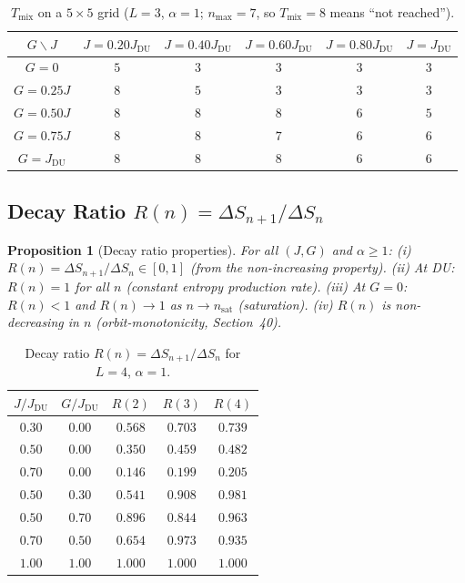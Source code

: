 \documentclass[12pt,a4paper]{article}
\newtheorem{proposition}[theorem]{Proposition}
\begin{document}
\begin{table}[h]
\centering
\caption{$T_\mathrm{mix}$ on a $5\times5$ grid ($L=3$, $\alpha=1$; $n_\mathrm{max}=7$,
so $T_\mathrm{mix}=8$ means ``not reached'').}
\label{tab:tmix}
\begin{tabular}{c|ccccc}
\hline
$G\backslash J$ & $J=0.20J_\mathrm{DU}$ & $J=0.40J_\mathrm{DU}$ & $J=0.60J_\mathrm{DU}$ & $J=0.80J_\mathrm{DU}$ & $J=J_\mathrm{DU}$ \\
\hline
$G=0$            & $5$ & $3$ & $3$ & $3$ & $3$ \\
$G=0.25J$        & $8$ & $5$ & $3$ & $3$ & $3$ \\
$G=0.50J$        & $8$ & $8$ & $8$ & $6$ & $5$ \\
$G=0.75J$        & $8$ & $8$ & $7$ & $6$ & $6$ \\
$G=J_\mathrm{DU}$ & $8$ & $8$ & $8$ & $6$ & $6$ \\
\hline
\end{tabular}
\end{table}

\subsection{Decay Ratio $R(n)=\Delta S_{n+1}/\Delta S_n$}
\label{subsec:decay_ratio}

\begin{proposition}[Decay ratio properties]\label{prop:decay_ratio}
For all $(J,G)$ and $\alpha\geq1$:
(i) $R(n)=\Delta S_{n+1}/\Delta S_n\in[0,1]$ (from the non-increasing property).
(ii) At DU: $R(n)=1$ for all $n$ (constant entropy production rate).
(iii) At $G=0$: $R(n)<1$ and $R(n)\to1$ as $n\to n_\mathrm{sat}$ (saturation).
(iv) $R(n)$ is non-decreasing in $n$ (orbit-monotonicity, Section~40).
\end{proposition}

\begin{table}[h]
\centering
\caption{Decay ratio $R(n)=\Delta S_{n+1}/\Delta S_n$ for $L=4$, $\alpha=1$.}
\label{tab:decay_ratio}
\begin{tabular}{cc|ccc}
\hline
$J/J_\mathrm{DU}$ & $G/J_\mathrm{DU}$ & $R(2)$ & $R(3)$ & $R(4)$ \\
\hline
$0.30$ & $0.00$ & $0.568$ & $0.703$ & $0.739$ \\
$0.50$ & $0.00$ & $0.350$ & $0.459$ & $0.482$ \\
$0.70$ & $0.00$ & $0.146$ & $0.199$ & $0.205$ \\
$0.50$ & $0.30$ & $0.541$ & $0.908$ & $0.981$ \\
$0.50$ & $0.70$ & $0.896$ & $0.844$ & $0.963$ \\
$0.70$ & $0.50$ & $0.654$ & $0.973$ & $0.935$ \\
$1.00$ & $1.00$ & $1.000$ & $1.000$ & $1.000$ \\
\hline
\end{tabular}
\end{table}
\end{document}
